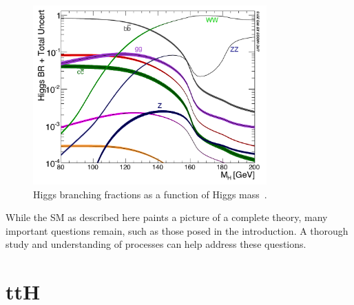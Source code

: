 \begin{figure}[hbtp]
 \begin{center}
   \includegraphics[width=0.8\textwidth]{ch2_figs/higgs_decay.pdf}
   \caption[Higgs branching fractions vs mass]{Higgs branching fractions as a function of Higgs mass~\cite{lhchxswg}.}
   \label{fig:higgs_decay}
 \end{center}
\end{figure}

While the SM as described here paints a picture of a complete theory, many important questions remain, such as those posed in the introduction.
A thorough study and understanding of \tth processes can help address these questions.  

\section{ttH}
